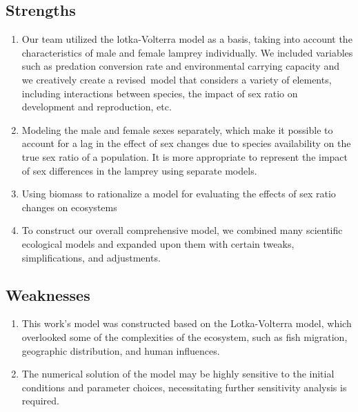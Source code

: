 \documentclass[12pt]{article}  %
\begin{document}
\subsection{Strengths}
\begin{enumerate}[\bfseries ·]
	\item Our team utilized the lotka-Volterra model as a basis, taking into account the characteristics of male and female lamprey individually. We included variables such as predation conversion rate and environmental carrying capacity and we creatively create a revised model that considers a variety of elements, including interactions between species, the impact of sex ratio on development and reproduction, etc.
	\item Modeling the male and female sexes separately, which make it possible to account for a lag in the effect of sex changes due to species availability on the true sex ratio of a population. It is more appropriate to represent the impact of sex differences in the lamprey using separate models.
	\item Using biomass to rationalize a model for evaluating the effects of sex ratio changes on ecosystems
	\item To construct our overall comprehensive model, we combined many scientific ecological models and expanded upon them with certain tweaks, simplifications, and adjustments.
\end{enumerate}
\subsection{Weaknesses}
\begin{enumerate}[\bfseries ·]
	\item This work's model was constructed based on the Lotka-Volterra model, which overlooked some of the complexities of the ecosystem, such as fish migration, geographic distribution, and human influences.
	\item The numerical solution of the model may be highly sensitive to the initial conditions and parameter choices, necessitating further sensitivity analysis is required.
	
\end{enumerate}
\end{document}
